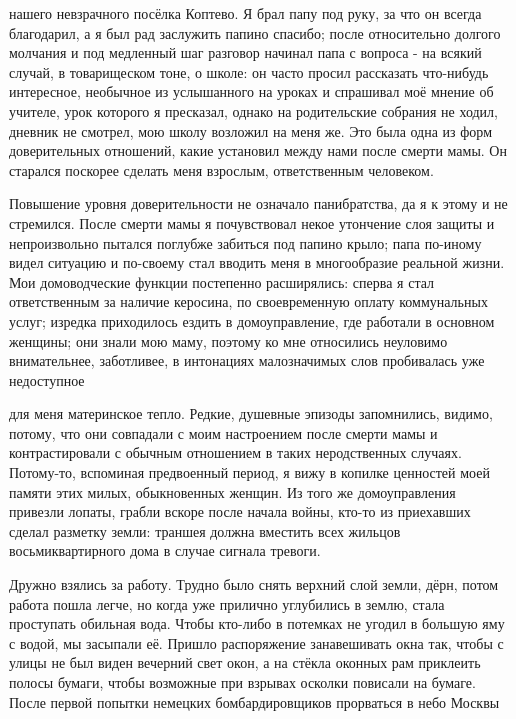 \label{202-1}
нашего невзрачного посёлка Коптево. Я брал папу под руку, за что он всегда благодарил, а я был рад заслужить папино спасибо; после относительно долгого молчания и под медленный шаг разговор начинал папа с вопроса - на всякий случай, в товарищеском тоне, о школе: он часто просил рассказать что-нибудь интересное, необычное из услышанного на уроках и спрашивал моё мнение об учителе, урок которого я пресказал, однако на родительские собрания не ходил, дневник не смотрел, мою школу возложил на меня же. Это была одна из форм доверительных отношений, какие установил между нами после смерти мамы. Он старался поскорее сделать  меня взрослым, ответственным человеком.

\label{203-1}
Повышение уровня доверительности не означало панибратства, да я к этому и не стремился. После смерти мамы я почувствовал некое утончение слоя защиты и непроизвольно пытался поглубже забиться под папино крыло; папа по-иному видел ситуацию и по-своему стал вводить меня в многообразие реальной жизни. Мои домоводческие функции постепенно расширялись: сперва я стал ответственным за наличие керосина, по своевременную оплату коммунальных услуг; изредка приходилось ездить в домоуправление, где работали в основном женщины; они знали мою маму, поэтому ко мне относились неуловимо внимательнее, заботливее, в интонациях малозначимых слов пробивалась уже недоступное

\label{204-1}
для меня материнское тепло. Редкие, душевные эпизоды запомнились, видимо, потому, что они совпадали с моим настроением после смерти мамы и контрастировали с обычным отношением в таких неродственных случаях. Потому-то, вспоминая предвоенный период, я вижу в копилке ценностей моей памяти этих милых, обыкновенных женщин. Из того же домоуправления привезли лопаты, грабли вскоре после начала войны, кто-то из приехавших сделал разметку земли: траншея должна вместить всех жильцов восьмиквартирного дома в случае сигнала тревоги.

\label{205-1}
Дружно взялись за работу. Трудно было снять верхний слой земли, дёрн, потом работа пошла легче, но когда уже прилично углубились в землю, стала проступать обильная вода. Чтобы кто-либо в потемках не угодил в большую яму с водой, мы засыпали её. Пришло распоряжение занавешивать окна так, чтобы с улицы не был виден вечерний свет окон, а на стёкла оконных рам приклеить полосы бумаги, чтобы возможные при взрывах осколки повисали на бумаге. После первой попытки немецких бомбардировщиков прорваться в небо Москвы

